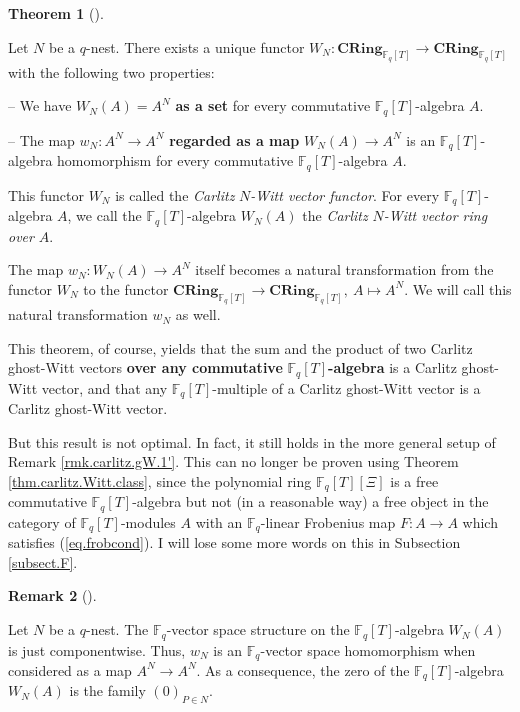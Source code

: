 \documentclass[numbers=enddot,12pt,final,onecolumn,notitlepage]{scrartcl}%
\theoremstyle{definition}
\newtheorem{theo}{Theorem}[section]
\newenvironment{theorem}[1][]
{\begin{theo}[#1]\begin{leftbar}}
{\end{leftbar}\end{theo}}
\newtheorem{remk}[theo]{Remark}
\newenvironment{remark}[1][]
{\begin{remk}[#1]\begin{leftbar}}
{\end{leftbar}\end{remk}}
\begin{document}
\begin{theorem}
\label{thm.carlitz.Witt.class}Let $N$ be a $q$-nest. There exists a unique
functor $W_{N}:\mathbf{CRing}_{\mathbb{F}_{q}\left[  T\right]  }%
\rightarrow\mathbf{CRing}_{\mathbb{F}_{q}\left[  T\right]  }$ with the
following two properties:

-- We have $W_{N}\left(  A\right)  =A^{N}$ \textbf{as a set} for every
commutative $\mathbb{F}_{q}\left[  T\right]  $-algebra $A$.

-- The map $w_{N}:A^{N}\rightarrow A^{N}$ \textbf{regarded as a map }%
$W_{N}\left(  A\right)  \rightarrow A^{N}$ is an $\mathbb{F}_{q}\left[
T\right]  $-algebra homomorphism for every commutative $\mathbb{F}_{q}\left[
T\right]  $-algebra $A$.

This functor $W_{N}$ is called the \textit{Carlitz }$N$\textit{-Witt vector
functor}. For every $\mathbb{F}_{q}\left[  T\right]  $-algebra $A$, we call
the $\mathbb{F}_{q}\left[  T\right]  $-algebra $W_{N}\left(  A\right)  $ the
\textit{Carlitz }$N$\textit{-Witt vector ring over }$A$.

The map $w_{N}:W_{N}\left(  A\right)  \rightarrow A^{N}$ itself becomes a
natural transformation from the functor $W_{N}$ to the functor $\mathbf{CRing}%
_{\mathbb{F}_{q}\left[  T\right]  }\rightarrow\mathbf{CRing}_{\mathbb{F}%
_{q}\left[  T\right]  },\ A\mapsto A^{N}$. We will call this natural
transformation $w_{N}$ as well.
\end{theorem}

This theorem, of course, yields that the sum and the product of two Carlitz
ghost-Witt vectors \textbf{over any commutative }$\mathbb{F}_{q}\left[
T\right]  $\textbf{-algebra} is a Carlitz ghost-Witt vector, and that any
$\mathbb{F}_{q}\left[  T\right]  $-multiple of a Carlitz ghost-Witt vector is
a Carlitz ghost-Witt vector.

But this result is not optimal. In fact, it still holds in the more general
setup of Remark \ref{rmk.carlitz.gW.1'}. This can no longer be proven using
Theorem \ref{thm.carlitz.Witt.class}, since the polynomial ring $\mathbb{F}%
_{q}\left[  T\right]  \left[  \Xi\right]  $ is a free commutative
$\mathbb{F}_{q}\left[  T\right]  $-algebra but not (in a reasonable way) a
free object in the category of $\mathbb{F}_{q}\left[  T\right]  $-modules $A$
with an $\mathbb{F}_{q}$-linear Frobenius map $F:A\rightarrow A$ which
satisfies (\ref{eq.frobcond}). I will lose some more words on this in
Subsection \ref{subsect.F}.

\begin{remark}
Let $N$ be a $q$-nest. The $\mathbb{F}_{q}$-vector space structure on the
$\mathbb{F}_{q}\left[  T\right]  $-algebra $W_{N}\left(  A\right)  $ is just
componentwise. Thus, $w_{N}$ is an $\mathbb{F}_{q}$-vector space homomorphism
when considered as a map $A^{N}\rightarrow A^{N}$. As a consequence, the zero
of the $\mathbb{F}_{q}\left[  T\right]  $-algebra $W_{N}\left(  A\right)  $ is
the family $\left(  0\right)  _{P\in N}$.
\end{remark}
\end{document}
